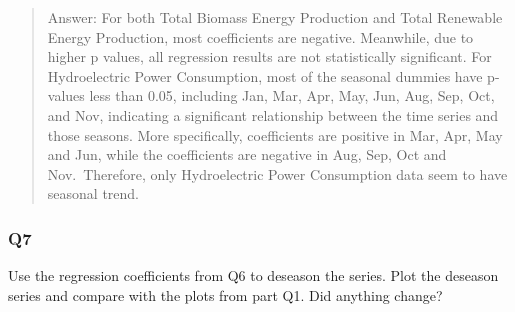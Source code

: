 \documentclass[
]{article}
\newenvironment{Shaded}{\begin{snugshade}}{\end{snugshade}}
\newcommand{\DecValTok}[1]{\textcolor[rgb]{0.00,0.00,0.81}{#1}}
\newcommand{\DocumentationTok}[1]{\textcolor[rgb]{0.56,0.35,0.01}{\textbf{\textit{#1}}}}
\newcommand{\NormalTok}[1]{#1}
\newcommand{\OtherTok}[1]{\textcolor[rgb]{0.56,0.35,0.01}{#1}}
\newcommand{\SpecialCharTok}[1]{\textcolor[rgb]{0.00,0.00,0.00}{#1}}
\begin{document}
\begin{Shaded}
\end{Shaded}

\begin{quote}
Answer: For both Total Biomass Energy Production and Total Renewable
Energy Production, most coefficients are negative. Meanwhile, due to
higher p values, all regression results are not statistically
significant. For Hydroelectric Power Consumption, most of the seasonal
dummies have p-values less than 0.05, including Jan, Mar, Apr, May, Jun,
Aug, Sep, Oct, and Nov, indicating a significant relationship between
the time series and those seasons. More specifically, coefficients are
positive in Mar, Apr, May and Jun, while the coefficients are negative
in Aug, Sep, Oct and Nov.~Therefore, only Hydroelectric Power
Consumption data seem to have seasonal trend.
\end{quote}

\hypertarget{q7}{%
\subsubsection{Q7}\label{q7}}

Use the regression coefficients from Q6 to deseason the series. Plot the
deseason series and compare with the plots from part Q1. Did anything
change?
\end{document}
